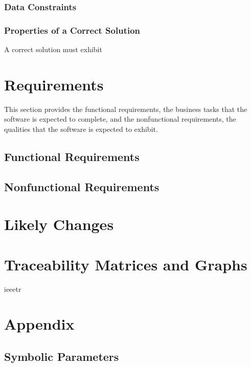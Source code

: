 \documentclass[12pt]{article}
\begin{document}

\subsubsection{Data Constraints} \label{sec_DataConstraints}    

\subsubsection{Properties of a Correct Solution} \label{sec_CorrectSolution}

\noindent
A correct solution must exhibit 

\section{Requirements}

This section provides the functional requirements, the business tasks that the
software is expected to complete, and the nonfunctional requirements, the
qualities that the software is expected to exhibit.

\subsection{Functional Requirements}


\subsection{Nonfunctional Requirements}


\section{Likely Changes}    


\section{Traceability Matrices and Graphs}



\newpage

 {ieeetr}

\newpage

\section{Appendix}


\subsection{Symbolic Parameters}
\end{document}
